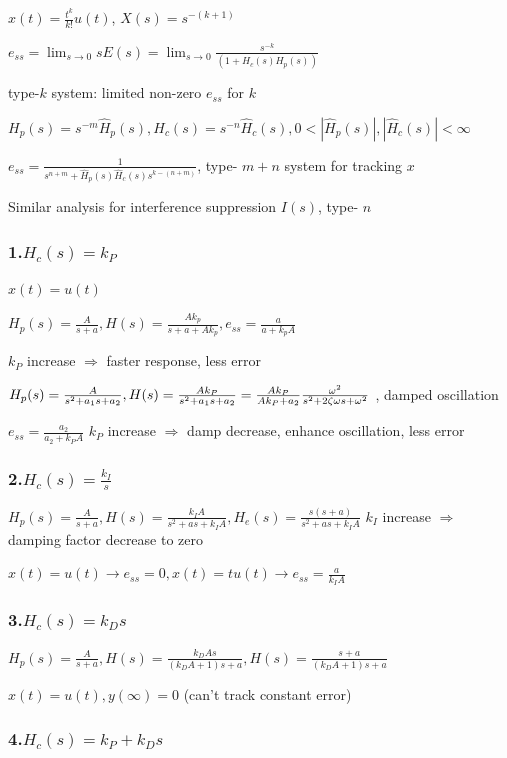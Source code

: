 $x(t) = \frac{t^k}{k!} u(t)$, $X(s) = s^{-(k+1)}$

$e_{ss} = \lim_{s\to 0} s E(s) = \lim_{s\to 0} \frac{s^{-k}}{(1 + H_c(s) H_p(s))}$

type-$k$ system: limited non-zero $e_{ss}$ for $k$


$H_p(s) = s^{-m} \hat H_p(s), H_c(s) = s^{-n} \hat H_c(s), 0< |\hat H_p(s)|, |\hat H_c(s)| < \infty $

$e_{ss} = \frac{1}{s^{n+m} + \hat H_p(s)\hat H_c(s)s^{k-(n+m)}} $, type- $m+n$ system for tracking $x$

Similar analysis for interference suppression $I(s)$, type- $n$

\subsubsection*{1.$H_c(s) = k_P$}

$x(t) = u(t)$

$H_p(s) = \frac{A}{s+a}, H(s) = \frac{Ak_p}{s+a+Ak_p}, e_{ss}= \frac{a}{a+k_pA}$

$k_P$ increase $\Rightarrow$ faster response, less error

$H_p(s) = \frac{A}{s^2+a_1s+a_2}, H(s) = \frac{Ak_P}{s^2+a_1s+a_2} = \frac{Ak_P}{Ak_P + a_2} \frac{\omega^2}{s^2+2\zeta\omega s + \omega^2}$ , damped oscillation

$e_{ss} = \frac{a_2}{a_2 + k_PA}$
$k_P$ increase $\Rightarrow$ damp decrease, enhance oscillation, less error

\subsubsection*{2.$H_c(s) =\frac{k_I}{s}$}

$H_p(s) = \frac{A}{s+a}, H(s)=\frac{k_IA}{s^2+as+k_IA}, H_e(s) =\frac{s(s+a)}{s^2+as+k_IA}$ 
$k_I$ increase $\Rightarrow$ damping factor decrease to zero

$x(t)=u(t)\rightarrow e_{ss} = 0, x(t) = tu(t)\rightarrow e_{ss} = \frac{a}{k_IA}$

\subsubsection*{3.$H_c(s) = k_Ds$}

$H_p(s)=\frac{A}{s+a}, H(s)=\frac{k_DAs}{(k_DA+1)s+a}, H(s)=\frac{s+a}{(k_DA+1)s+a}$

$x(t)=u(t), y(\infty)=0$ (can't track constant error)

\subsubsection*{4.$H_c(s) = k_P+k_Ds$}

